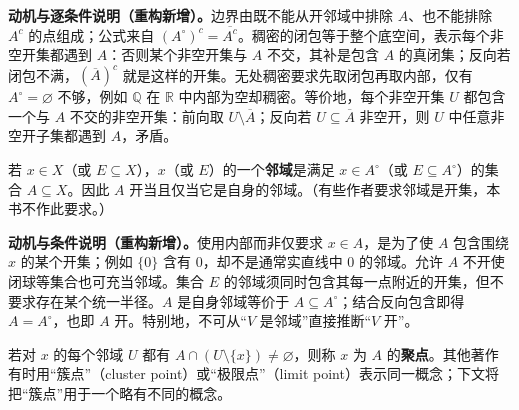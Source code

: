\documentclass[../../main.tex]{subfiles}%
\begin{document}
\begin{remark}
\textbf{动机与逐条件说明（重构新增）。}边界由既不能从开邻域中排除 $A$、也不能排除 $A^c$ 的点组成；公式来自 $(A^\circ)^c=\overline{A^c}$。稠密的闭包等于整个底空间，表示每个非空开集都遇到 $A$：否则某个非空开集与 $A$ 不交，其补是包含 $A$ 的真闭集；反向若闭包不满，$(\overline A)^c$ 就是这样的开集。无处稠密要求先取闭包再取内部，仅有 $A^\circ=\varnothing$ 不够，例如 $\mathbb Q$ 在 $\mathbb R$ 中内部为空却稠密。等价地，每个非空开集 $U$ 都包含一个与 $A$ 不交的非空开集：前向取 $U\setminus\overline A$；反向若 $U\subseteq\overline A$ 非空开，则 $U$ 中任意非空开子集都遇到 $A$，矛盾。
\end{remark}
\begin{definition}[邻域]\label{definition:ch04-neighborhood}
若 $x\in X$（或 $E\subseteq X$），$x$（或 $E$）的一个\textbf{邻域}是满足 $x\in A^\circ$（或 $E\subseteq A^\circ$）的集合 $A\subseteq X$。因此 $A$ 开当且仅当它是自身的邻域。（有些作者要求邻域是开集，本书不作此要求。）
\end{definition}
\begin{remark}
\textbf{动机与条件说明（重构新增）。}使用内部而非仅要求 $x\in A$，是为了使 $A$ 包含围绕 $x$ 的某个开集；例如 $\{0\}$ 含有 $0$，却不是通常实直线中 $0$ 的邻域。允许 $A$ 不开使闭球等集合也可充当邻域。集合 $E$ 的邻域须同时包含其每一点附近的开集，但不要求存在某个统一半径。$A$ 是自身邻域等价于 $A\subseteq A^\circ$；结合反向包含即得 $A=A^\circ$，也即 $A$ 开。特别地，不可从“$V$ 是邻域”直接推断“$V$ 开”。
\end{remark}
\begin{definition}[聚点]\label{definition:ch04-accumulation-point}
若对 $x$ 的每个邻域 $U$ 都有 $A\cap(U\setminus\{x\})\ne\varnothing$，则称 $x$ 为 $A$ 的\textbf{聚点}。其他著作有时用“簇点”（cluster point）或“极限点”（limit point）表示同一概念；下文将把“簇点”用于一个略有不同的概念。
\end{definition}
\end{document}
